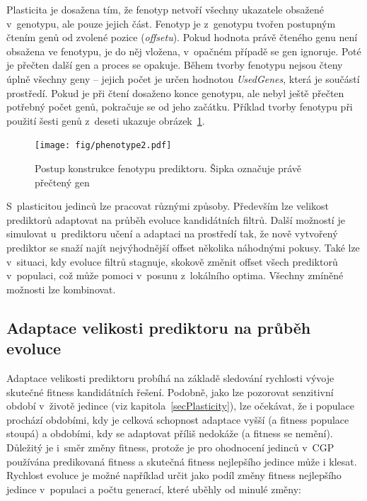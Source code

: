 Plasticita je dosažena tím, že fenotyp netvoří všechny ukazatele obsažené v~genotypu, ale pouze jejich část. Fenotyp je z~genotypu tvořen postupným čtením genů od zvolené pozice (\emph{offsetu}). Pokud hodnota právě čteného genu není obsažena ve fenotypu, je do něj vložena, v~opačném případě se gen ignoruje. Poté je přečten další gen a proces se opakuje. Během tvorby fenotypu nejsou čteny úplně všechny geny -- jejich počet je určen hodnotou \emph{UsedGenes}, která je součástí prostředí. Pokud je při čtení dosaženo konce genotypu, ale nebyl ještě přečten potřebný počet genů, pokračuje se od jeho začátku. Příklad tvorby fenotypu při použití šesti genů z~deseti ukazuje obrázek~\ref{obrFenotyp}.

\begin{figure}[htb]
    \centering\texttt{[image: fig/phenotype2.pdf]}
    \caption{Postup konstrukce fenotypu prediktoru. Šipka označuje právě přečtený gen}
    \label{obrFenotyp}
\end{figure}

S~plasticitou jedinců lze pracovat různými způsoby. Především lze velikost prediktorů adaptovat na průběh evoluce kandidátních filtrů. Další možností je simulovat u~prediktoru učení a adaptaci na prostředí tak, že nově vytvořený prediktor se snaží najít nejvýhodnější offset několika náhodnými pokusy. Také lze v~situaci, kdy evoluce filtrů stagnuje, skokově změnit offset všech prediktorů v~populaci, což může pomoci v~posunu z~lokálního optima. Všechny zmíněné možnosti lze kombinovat.

\subsection{Adaptace velikosti prediktoru na průběh evoluce}
\label{secDesignAdaptation}

Adaptace velikosti prediktoru probíhá na základě sledování rychlosti vývoje skutečné fitness kan\-di\-dát\-ních ře\-šení. Podobně, jako lze pozorovat senzitivní období v~životě jedince (viz kapitola~\ref{secPlasticity}), lze očekávat, že i populace prochází obdobími, kdy je celková schopnost adaptace vyšší (a fitness populace stoupá) a obdobími, kdy se adaptovat příliš nedokáže (a fitness se nemění). Důležitý je i~směr změny fitness, protože je pro ohodnocení je\-dinců v~CGP používána predikovaná fitness a skutečná fitness nejlepšího jedince může i klesat. Rychlost evoluce je možné například určit jako podíl změny fitness nej\-lep\-šího jedince v~populaci a počtu generací, které uběhly od minulé změny:

